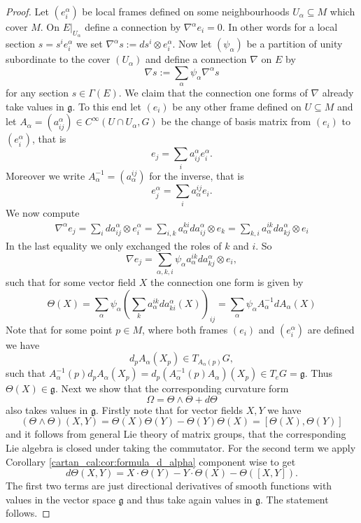 \begin{proof}
    Let $(e_i^\alpha)$ be local frames defined on some neighbourhoods $U_\alpha \subseteq M$ which cover $M$. On $E|_{U_\alpha}$ define a connection by $\nabla^\alpha e_i = 0$. In other words for a local section $s = s^i e_i^\alpha$ we set $\nabla^\alpha s := d s^i \otimes e_i^\alpha$. Now let $(\psi_\alpha)$ be a partition of unity subordinate to the cover $(U_\alpha)$ and define a connection $\nabla$ on $E$ by 
    \[
    \nabla s := \sum_{\alpha} \psi_\alpha \nabla^\alpha s
    \]
    for any section $s \in \Gamma(E)$. We claim that the connection one forms of $\nabla$ already take values in $\mathfrak{g}$. To this end let $(e_i)$ be any other frame defined on $U \subseteq M$ and let $A_\alpha = (a_{ij}^\alpha) \in C^\infty(U \cap U_\alpha,G)$ be the change of basis matrix from $(e_i)$ to $(e_i^\alpha)$, that is 
    \[
    e_j = \sum_{i} a_{ij}^\alpha e_i^\alpha.
    \]
    Moreover we write $A_\alpha^{-1} = (a^{ij}_\alpha)$ for the inverse, that is 
    \[
    e_j^\alpha = \sum_{i} a^{ij}_\alpha e_i.
    \]
    We now compute 
    \begin{align*}
        \nabla^\alpha e_j = \sum_i d a_{ij}^\alpha \otimes e_i^\alpha = \sum_{i,k} a_\alpha^{ki} da_{ij}^\alpha \otimes e_k = \sum_{k,i} a_\alpha^{ik} da_{kj}^\alpha \otimes e_i 
    \end{align*}
    In the last equality we only exchanged the roles of $k$ and $i$. So 
    \[
    \nabla e_j = \sum_{\alpha,k,i} \psi_\alpha a_\alpha^{ik} da_{kj}^\alpha \otimes e_i,
    \]
    such that for some vector field $X$ the connection one form is given by 
    \[
    \Theta(X) = \sum_\alpha \psi_\alpha \left(\sum_k a_\alpha^{ik} da_{ki}^\alpha(X) \right)_{ij} = \sum_\alpha \psi_\alpha A_\alpha^{-1} dA_\alpha(X)
    \]
    Note that for some point $p \in M$, where both frames $(e_i)$ and $(e_i^\alpha)$ are defined we have $$d_pA_\alpha(X_p) \in T_{A_\alpha(p)} G,$$ such that $A_\alpha^{-1}(p) d_pA_\alpha(X_p) = d_p(A_\alpha^{-1}(p)A_\alpha)(X_p) \in T_e G = \mathfrak{g}$. Thus $\Theta(X) \in \mathfrak{g}$. Next we show that the corresponding curvature form 
    \[
    \Omega = \Theta \wedge \Theta + d\Theta
    \]
    also takes values in $\mathfrak{g}$. Firstly note that for vector fields $X,Y$ we have 
    \[  
    (\Theta \wedge \Theta)(X,Y) = \Theta(X)\Theta(Y) - \Theta(Y)\Theta(X) = [\Theta(X),\Theta(Y)]
    \]
    and it follows from general Lie theory of matrix groups, that the corresponding Lie algebra is closed under taking the commutator. For the second term we apply Corollary \ref{cartan_cal:cor:formula_d_alpha} component wise to get 
    \[
    d\Theta(X,Y) = X \cdot \Theta(Y) - Y \cdot \Theta(X) - \Theta([X,Y]).
    \]
    The first two terms are just directional derivatives of smooth functions with values in the vector space $\mathfrak{g}$ and thus take again values in $\mathfrak{g}$. The statement follows.
\end{proof}

